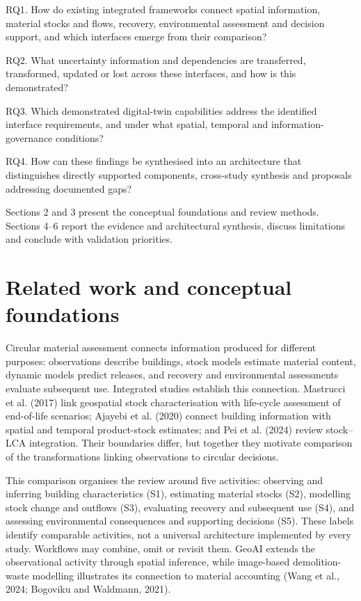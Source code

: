 RQ1. How do existing integrated frameworks connect spatial information, material stocks and flows, recovery, environmental assessment and decision support, and which interfaces emerge from their comparison?

RQ2. What uncertainty information and dependencies are transferred, transformed, updated or lost across these interfaces, and how is this demonstrated?

RQ3. Which demonstrated digital-twin capabilities address the identified interface requirements, and under what spatial, temporal and information-governance conditions?

RQ4. How can these findings be synthesised into an architecture that distinguishes directly supported components, cross-study synthesis and proposals addressing documented gaps?

Sections 2 and 3 present the conceptual foundations and review methods. Sections 4–6 report the evidence and architectural synthesis, discuss limitations and conclude with validation priorities.


\section{Related work and conceptual foundations}
Circular material assessment connects information produced for different purposes: observations describe buildings, stock models estimate material content, dynamic models predict releases, and recovery and environmental assessments evaluate subsequent use. Integrated studies establish this connection. Mastrucci et al. (2017) link geospatial stock characterisation with life-cycle assessment of end-of-life scenarios; Ajayebi et al. (2020) connect building information with spatial and temporal product-stock estimates; and Pei et al. (2024) review stock–LCA integration. Their boundaries differ, but together they motivate comparison of the transformations linking observations to circular decisions.

This comparison organises the review around five activities: observing and inferring building characteristics (S1), estimating material stocks (S2), modelling stock change and outflows (S3), evaluating recovery and subsequent use (S4), and assessing environmental consequences and supporting decisions (S5). These labels identify comparable activities, not a universal architecture implemented by every study. Workflows may combine, omit or revisit them. GeoAI extends the observational activity through spatial inference, while image-based demolition-waste modelling illustrates its connection to material accounting (Wang et al., 2024; Bogoviku and Waldmann, 2021).

